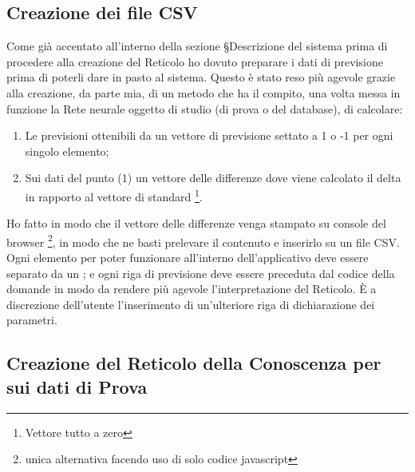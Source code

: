 \subsection{Creazione dei file CSV}
\label{Creazione dei file CSV}
Come gi\`a accentato all'interno della sezione §{Descrizione del sistema} prima di procedere alla creazione del Reticolo ho dovuto preparare i dati di previsione prima di poterli dare in pasto al sistema. Questo \`e stato reso pi\`u agevole grazie alla creazione, da parte mia, di un metodo che ha il compito, una volta messa in funzione la Rete neurale oggetto di studio (di prova o del database), di calcolare:
\begin{enumerate}
\item Le previsioni ottenibili da un vettore di previsione settato a 1 o -1 per ogni singolo elemento;
\item Sui dati del punto (1) un vettore delle differenze dove viene calcolato il delta in rapporto al vettore di standard \footnote{Vettore tutto a zero}.
\end{enumerate}
\noindent
Ho fatto in modo che il vettore delle differenze venga stampato su console del browser \footnote{unica alternativa facendo uso di solo codice javascript}, in modo che ne basti prelevare il contenuto e inserirlo su un file CSV. Ogni elemento per poter funzionare all'interno dell'applicativo deve essere separato da un ; e ogni riga di previsione deve essere preceduta dal codice della domande in modo da rendere pi\`u agevole l'interpretazione del Reticolo. \`E a discrezione dell'utente l'inserimento di un'ulteriore riga di dichiarazione dei parametri.

\subsection{Creazione del Reticolo della Conoscenza per sui dati di Prova}
\label{Creazione del Reticolo della Conoscenza per sui dati di Prova}

